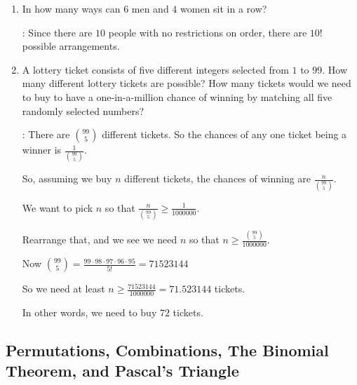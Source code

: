 \documentclass[11pt]{amsart}
\begin{document}
\begin{enumerate}
 \medskip
 
\item In how many ways can $6$ men and $4$ women sit in a row?

: Since there are $10$ people with no restrictions on order, there are $10!$
possible arrangements.

\medskip

\item A lottery ticket consists of five different integers selected from $1$ to $99$.
How many different lottery tickets are possible? How many tickets would we need
to buy to have a one-in-a-million chance of winning by matching all five randomly
selected numbers?

: There are $\displaystyle \binom{99}{5}$ different tickets.
So the chances of any one ticket being a winner is $\displaystyle \frac{1}{\binom{99}{5}}$.

So, assuming we buy $n$ different tickets, the chances of winning are  $\displaystyle \frac{n}{\binom{99}{5}}$.

We want to pick $n$ so that $\displaystyle \frac{n}{\binom{99}{5}}\geq \frac{1}{1000000}$.

Rearrange that, and we see we need $n$ so that
$\displaystyle n\geq  \frac{\binom{99}{5}}{1000000}$.

\medskip

Now  $\displaystyle \binom{99}{5} = \frac{99\cdot98\cdot97\cdot96\cdot95}{5!} = 71523144$

\medskip

So we need at least $\displaystyle n\geq \frac{71523144}{1000000}= 71.523144$ tickets.

\medskip
In other words, we need to buy $72$ tickets.

\end{enumerate}

\subsection{Permutations, Combinations, The Binomial Theorem, and Pascal's Triangle}
\end{document}
